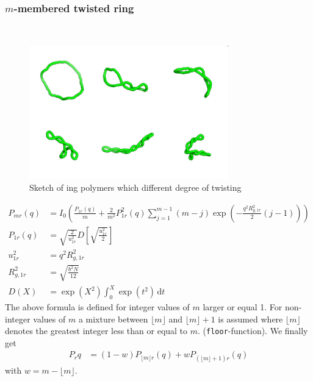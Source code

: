 
\clearpage
\subsubsection{$m$-membered twisted ring }
\label{sect:mMemberedTwistedRing}
~\\
\cite{Burchard1996}
\begin{figure}[htb]
\begin{center}
\includegraphics[width=0.768\textwidth,height=0.516\textwidth]{TWsnap.png}
\end{center}
\caption{Sketch of ing polymers which different degree of twisting}
\label{fig:mMemberedTwistedRing}
\end{figure}

\begin{align}
P_{mr}(q) & = I_0\left(\frac{P_{1r}(q)}{m} + \frac{2}{m^2}P_{1r}^2(q)\sum_{j=1}^{m-1}(m-j)\exp\left(-\frac{q^2R^2_{g,1r}}{2}(j-1)\right)\right) \\
P_{1r}(q) & = \sqrt{\frac{2}{u_{1r}^2}} D\left[ \sqrt{\frac{u_{1r}^2}{2}} \right] \\
u_{1r}^2 &= q^2R^2_{g,1r} \\
R^2_{g,1r} &= \sqrt{\frac{b^2N}{12}} \\
D(X) &= \exp\left(X^2\right) \int_0^X \exp(t^2)\, \mathrm{d}t
\end{align}
The above formula is defined for integer values of $m$ larger or equal 1. For non-integer values of $m$ a mixture between $\lfloor m\rfloor$ and $\lfloor m\rfloor+1$ is assumed where $\lfloor m \rfloor$ denotes the greatest integer less than or equal to $m$. (\texttt{\texttt{floor}}-function). We finally get
\begin{align}
P_r{q} &= (1-w)P_{\lfloor m\rfloor r}(q) + w P_{(\lfloor m\rfloor+1) r}(q)
\end{align}
with $w=m-\lfloor m\rfloor$.

